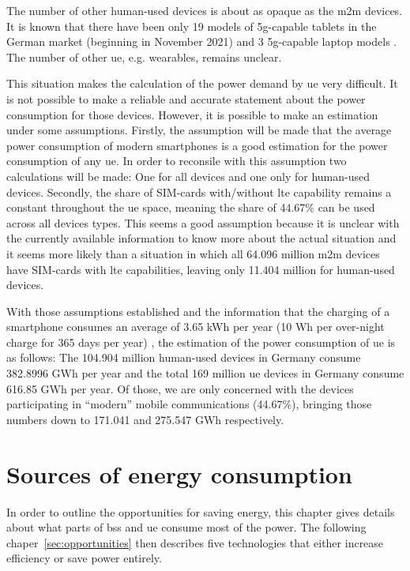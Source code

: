 \documentclass[11pt,a4paper]{article}
\begin{document}
The number of other human-used devices is about as opaque as the \acrshort{m2m} devices.
It is known that there have been only 19 models of \acrshort{5g}-capable tablets in the German market (beginning in November 2021) \citep{tabletmodels} and 3 \acrshort{5g}-capable laptop models \citep{laptopmodels}.
The number of other \acrlong{ue}, e.g. wearables, remains unclear.

This situation makes the calculation of the power demand by \acrlong{ue} very difficult.
It is not possible to make a reliable and accurate statement about the power consumption for those devices.
However, it is possible to make an estimation under some assumptions.
Firstly, the assumption will be made that the average power consumption of modern smartphones is a good estimation for the power consumption of any \acrshort{ue}.
In order to reconsile with this assumption two calculations will be made: One for all devices and one only for human-used devices.
Secondly, the share of SIM-cards with/without \acrshort{lte} capability remains a constant throughout the \acrlong{ue} space, meaning the share of 44.67\% can be used across all devices types.
This seems a good assumption because it is unclear with the currently available information to know more about the actual situation and it seems more likely than a situation in which all 64.096 million \acrshort{m2m} devices have SIM-cards with \acrshort{lte} capabilities, leaving only 11.404 million for human-used devices.


With those assumptions established and the information that the charging of a smartphone consumes an average of 3.65 kWh per year (10 Wh per over-night charge for 365 days per year) \citep{smartphonecharge}, the estimation of the power consumption of \acrshort{ue} is as follows:
The 104.904 million human-used devices in Germany consume 382.8996 GWh per year and the total 169 million \acrshort{ue} devices in Germany consume 616.85 GWh per year.
Of those, we are only concerned with the devices participating in \enquote{modern} mobile communications (44.67\%), bringing those numbers down to 171.041 and 275.547 GWh respectively.

\section{Sources of energy consumption}\label{sec:energyconsumption}
In order to outline the opportunities for saving energy, this chapter gives details about what parts of \acrlong{bs}s and \acrlong{ue} consume most of the power.
The following chaper~\ref{sec:opportunities} then describes five technologies that either increase efficiency or save power entirely.
\end{document}
